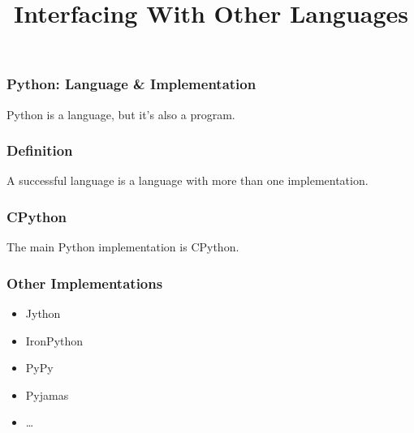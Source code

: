 
\title{Interfacing With Other Languages}

\frame{\maketitle}

\begin{frame}[fragile]
\frametitle{Python: Language \& Implementation}
Python is a language, but it's also a program.
\end{frame}

\begin{frame}[fragile]
\frametitle{Definition}

A \alert{successful language} is a language with more than one implementation.

\end{frame}

\begin{frame}[fragile]
\frametitle{CPython}
The main Python implementation is \alert{CPython}.
\end{frame}

\begin{frame}[fragile]
\frametitle{Other Implementations}
\begin{itemize}
\item Jython
\item IronPython
\item PyPy
\item Pyjamas
\item \ldots
\end{itemize}
\end{frame}


